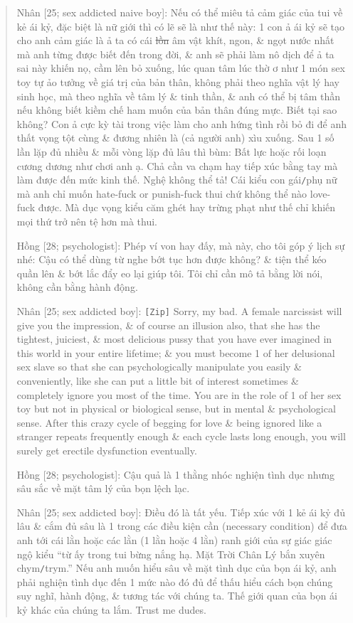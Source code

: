 \documentclass[12pt,twoside]{book}
\begin{document}
\begin{quote}
	{\sf Nhân [25; sex addicted naive boy]}: Nếu có thể miêu tả cảm giác của tui về kẻ ái kỷ, đặc biệt là nữ giới thì có lẽ sẽ là như thế này: 1 con ả ái kỷ sẽ tạo cho anh cảm giác là ả ta có cái \st{lồn} âm vật khít, ngon, \& ngọt nước nhất mà anh từng được biết đến trong đời, \& anh sẽ phải làm nô dịch để ả ta sai này khiến nọ, cầm lên bỏ xuống, lúc quan tâm lúc thờ ơ như 1 món sex toy tự ảo tưởng về giá trị của bản thân, không phải theo nghĩa vật lý hay sinh học, mà theo nghĩa về tâm lý \& tinh thần, \& anh có thể bị tâm thần nếu không biết kiềm chế ham muốn của bản thân đúng mực. Biết tại sao không? Con ả cực kỳ tài trong việc làm cho anh hứng tình rồi bỏ đi để anh thất vọng tột cùng \& đương nhiên là (cả người anh) xìu xuống. Sau 1 số lần lặp đủ nhiều \& mỗi vòng lặp đủ lâu thì bùm: Bất lực hoặc rối loạn cương dương như chơi anh ạ. Chả cần va chạm hay tiếp xúc bằng tay mà làm được đến mức kinh thế. Nghệ không thể tả! Cái kiểu con gái{\tt/}phụ nữ mà anh chỉ muốn hate-fuck or punish-fuck thui chứ không thể nào love-fuck được. Mà dục vọng kiểu căm ghét hay trừng phạt như thế chỉ khiến mọi thứ trở nên tệ hơn mà thui.
	
	{\sf Hồng [28; psychologist]:} Phép ví von hay đấy, mà này, cho tôi góp ý lịch sự nhé: Cậu có thể dùng từ nghe bớt tục hơn được không? \& tiện thể kéo quần lên \& bớt lắc đẩy eo lại giúp tôi. Tôi chỉ cần mô tả bằng lời nói, không cần bằng hành động.
	
	{\sf Nhân [25; sex addicted boy]:} {\tt[Zip]} Sorry, my bad. A female narcissist will give you the impression, \& of course an illusion also, that she has the tightest, juiciest, \& most delicious pussy that you have ever imagined in this world in your entire lifetime; \& you must become 1 of her delusional sex slave so that she can psychologically manipulate you easily \& conveniently, like she can put a little bit of interest sometimes \& completely ignore you most of the time. You are in the role of 1 of her sex toy but not in physical or biological sense, but in mental \& psychological sense. After this crazy cycle of begging for love \& being ignored like a stranger repeats frequently enough \& each cycle lasts long enough, you will surely get erectile dysfunction eventually.
	
	{\sf Hồng [28; psychologist]:} Cậu quả là 1 thằng nhóc nghiện tình dục nhưng sâu sắc về mặt tâm lý của bọn lệch lạc.
	
	{\sf Nhân [25; sex addicted boy]:} Điều đó là tất yếu. Tiếp xúc với 1 kẻ ái kỷ đủ lâu \& cắm đủ sâu là 1 trong các điều kiện cần (necessary condition) để đưa anh tới cái lằn hoặc các lằn (1 lằn hoặc 4 lằn) ranh giới của sự giác giác ngộ kiểu ``từ ấy trong tui bừng nắng hạ. Mặt Trời Chân Lý bắn xuyên chym{\tt/}trym.'' Nếu anh muốn hiểu sâu về mặt tình dục của bọn ái kỷ, anh phải nghiện tình dục đến 1 mức nào đó đủ để thấu hiểu cách bọn chúng suy nghĩ, hành động, \& tương tác với chúng ta. Thế giới quan của bọn ái kỷ khác của chúng ta lắm. Trust me dudes.
\end{quote}
\end{document}
